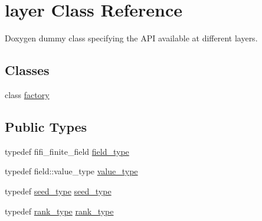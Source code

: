 \hypertarget{classlayer}{\section{layer Class Reference}
\label{classlayer}
}


Doxygen dummy class specifying the A\-P\-I available at different layers.  


\subsection*{Classes}
\begin{DoxyCompactItemize}
\item 
class \hyperlink{classlayer_1_1factory}{factory}
\end{DoxyCompactItemize}
\subsection*{Public Types}
\begin{DoxyCompactItemize}
\item 
typedef fifi\-\_\-finite\-\_\-field \hyperlink{classlayer_a495d6846a7311be01266914e60e7d9c6}{field\-\_\-type}
\item 
typedef field\-::value\-\_\-type \hyperlink{classlayer_a3ad6d6930927932e5c25f2a2b5277cc0}{value\-\_\-type}
\item 
typedef \hyperlink{classlayer_abd92e03d53ae960a9ef1e7a63fa06ccb}{seed\-\_\-type} \hyperlink{classlayer_abd92e03d53ae960a9ef1e7a63fa06ccb}{seed\-\_\-type}
\item 
typedef \hyperlink{classlayer_a1de820b75c9af3faf024dee2b22599e4}{rank\-\_\-type} \hyperlink{classlayer_a1de820b75c9af3faf024dee2b22599e4}{rank\-\_\-type}
\end{DoxyCompactItemize}
